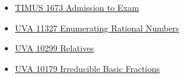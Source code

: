 \begin{itemize}
	\item \href{http://acm.timus.ru/problem.aspx?space=1&num=1673}{TIMUS 1673 Admission to Exam}
	\item \href{http://uva.onlinejudge.org/index.php?option=com_onlinejudge&Itemid=8&page=show_problem&problem=2302}{UVA 11327 Enumerating Rational Numbers}
	\item \href{http://uva.onlinejudge.org/index.php?option=onlinejudge&page=show_problem&problem=1240}{UVA 10299 Relatives}
	\item \href{http://uva.onlinejudge.org/index.php?option=onlinejudge&page=show_problem&problem=1120}{UVA 10179 Irreducible Basic Fractions}

\end{itemize} 